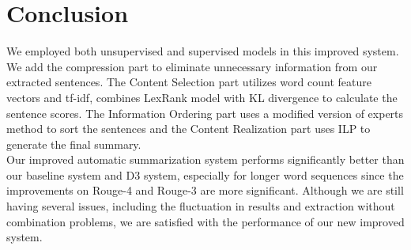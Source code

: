 \documentclass[11pt]{article}
\begin{document}
\section{Conclusion}

We employed both unsupervised and supervised models in this improved system. We add the compression part to eliminate unnecessary information from our extracted sentences. The Content Selection part utilizes word count feature vectors and tf-idf, combines LexRank model with KL divergence to calculate the sentence scores. The Information Ordering part uses a modified version of experts method to sort the sentences and the Content Realization part uses ILP to generate the final summary. \\
\indent
Our improved automatic summarization system performs significantly better than our baseline system and D3 system, especially for longer word sequences since the improvements on Rouge-4 and Rouge-3 are more significant. Although we are still having several issues, including the fluctuation in results and extraction without combination problems, we are satisfied with the performance of our new improved system.
\end{document}
